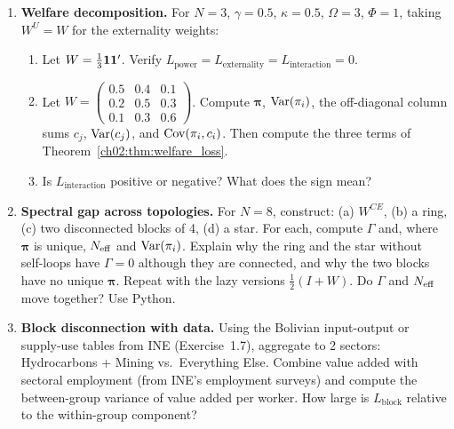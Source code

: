\documentclass[../structural_economics_book.tex]{subfiles}
\begin{document}
\begin{enumerate}[label=\textbf{2.\arabic*}, leftmargin=3em]
\item \textbf{Welfare decomposition.} For $N = 3$, $\gamma = 0.5$, $\kappa = 0.5$, $\Omega = 3$, $\Phi = 1$, taking $W^U = W$ for the externality weights:
\begin{enumerate}
\item Let $W = \frac{1}{3}\mathbf{1}\mathbf{1}'$. Verify $L_{\text{power}} = L_{\text{externality}} = L_{\text{interaction}} = 0$.
\item Let $W = \begin{pmatrix} 0.5 & 0.4 & 0.1 \\ 0.2 & 0.5 & 0.3 \\ 0.1 & 0.3 & 0.6 \end{pmatrix}$. Compute $\boldsymbol{\pi}$, $\operatorname{Var}(\pi_i)$, the off-diagonal column sums $c_j$, $\operatorname{Var}(c_j)$, and $\operatorname{Cov}(\pi_i, c_i)$. Then compute the three terms of Theorem~\ref{ch02:thm:welfare_loss}.
\item Is $L_{\text{interaction}}$ positive or negative? What does the sign mean?
\end{enumerate}

\item \textbf{Spectral gap across topologies.} For $N = 8$, construct: (a) $W^{CE}$, (b) a ring, (c) two disconnected blocks of 4, (d) a star. For each, compute $\Gamma$ and, where $\boldsymbol{\pi}$ is unique, $N_{\text{eff}}$ and $\operatorname{Var}(\pi_i)$. Explain why the ring and the star without self-loops have $\Gamma = 0$ although they are connected, and why the two blocks have no unique $\boldsymbol{\pi}$. Repeat with the lazy versions $\frac{1}{2}(I + W)$. Do $\Gamma$ and $N_{\text{eff}}$ move together? Use Python.

\item \textbf{Block disconnection with data.} Using the Bolivian input-output or supply-use tables from INE (Exercise~1.7), aggregate to 2 sectors: Hydrocarbons + Mining vs.\ Everything Else. Combine value added with sectoral employment (from INE's employment surveys) and compute the between-group variance of value added per worker. How large is $L_{\text{block}}$ relative to the within-group component?


\end{enumerate}
\end{document}
